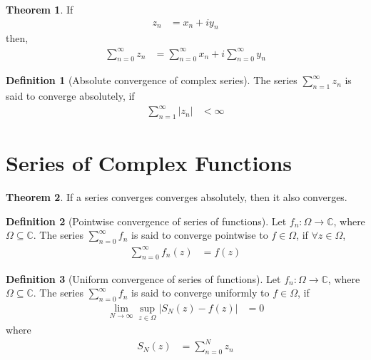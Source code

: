 \documentclass[titlepage, fleqn, a4paper, 12pt, twoside]{article}
\theoremstyle{definition}
\newtheorem{definition}{Definition}
\theoremstyle{theorem}
\newtheorem{theorem}{Theorem}
\begin{document}
\begin{theorem}
	If
	\begin{align*}
		z_n & = x_n + i y_n
	\end{align*}
	then,
	\begin{align*}
		\sum\limits_{n = 0}^{\infty} z_n & = \sum\limits_{n = 0}^{\infty} x_n + i \sum\limits_{n = 0}^{\infty} y_n
	\end{align*}
\end{theorem}

\begin{definition}[Absolute convergence of complex series]
	The series $\sum\limits_{n = 1}^{\infty} z_n$ is said to converge absolutely, if
	\begin{align*}
		\sum\limits_{n = 1}^{\infty} |z_n| & < \infty
	\end{align*}
\end{definition}

\section{Series of Complex Functions}

\begin{theorem}
	If a series converges converges absolutely, then it also converges.
\end{theorem}

\begin{definition}[Pointwise convergence of series of functions]
	Let $f_n : \Omega \to \mathbb{C}$, where $\Omega \subseteq \mathbb{C}$.
	The series $\sum\limits_{n = 0}^{\infty} f_n$ is said to converge pointwise to $f \in \Omega$, if $\forall z \in \Omega$,
	\begin{align*}
		\sum\limits_{n = 0}^{\infty} f_n(z) & = f(z)
	\end{align*}
\end{definition}

\begin{definition}[Uniform convergence of series of functions]
	Let $f_n : \Omega \to \mathbb{C}$, where $\Omega \subseteq \mathbb{C}$.
	The series $\sum\limits_{n = 0}^{\infty} f_n$ is said to converge uniformly to $f \in \Omega$, if
	\begin{align*}
		\lim\limits_{N \to \infty} \sup\limits_{z \in \Omega} \left| S_N(z) - f(z) \right| & = 0
	\end{align*}
	where
	\begin{align*}
		S_N(z) & = \sum\limits_{n = 0}^{N} z_n
	\end{align*}
\end{definition}
\end{document}
